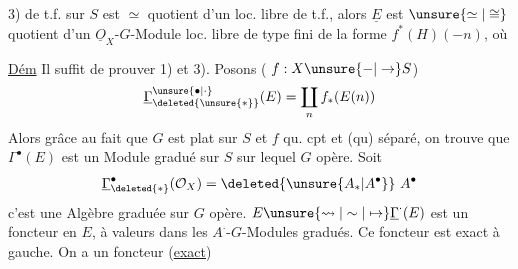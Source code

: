
3) 
de t.f. sur $S$ est $\simeq$ quotient d'un loc. libre de t.f.,
 alors $\underline E$ est $\unsure{\simeq|\cong}$ quotient d'un
$\underline O_X$-$G$-Module loc. libre de type fini
de la forme $f^*(H)(-n)$, où

\uline{Dém} Il suffit de prouver 1) et 3). Posons
( $f:X\unsure{-|\to}S$)
\[
\underline{\Gamma}_{\deleted{\unsure{*}}}^{\unsure{\bullet|\cdot}}(E)=\coprod_n f_*(E(n))
\]
Alors grâce au fait que $G$ est plat sur $S$
et $f$ qu. cpt et (qu) séparé, on trouve que
$\Gamma^\bullet(E)$ est un Module gradué sur $S$ sur
lequel $G$ opère. Soit
\[
\underline{\Gamma}_{\deleted{*}}^\bullet(\mathcal O_X)=\deleted{\unsure{A_*|A^\bullet}}\ A^\bullet
\]
c'est une Algèbre graduée sur 
$G$ opère. $E\unsure{\leadsto|\sim|\mapsto}\underline{\Gamma}^{\cdot}(E)$ est un foncteur en
$E$, à valeurs dans les 
$A^{\cdot}$-$G$-Modules gradués. Ce foncteur
est exact à gauche. On a un foncteur
(\uline{exact})
